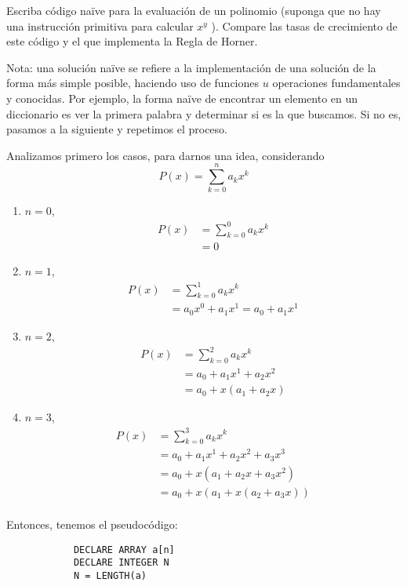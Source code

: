 \begin{problema}
    Escriba código naïve para la evaluación de un polinomio (suponga que no hay una instrucción primitiva para calcular $x^y$ ). Compare las tasas de crecimiento de este código y el que implementa la Regla de Horner.
    \begin{cajita}
        Nota: una solución naïve se refiere a la implementación de una solución de la forma más simple posible, haciendo uso de funciones $u$ operaciones fundamentales y conocidas. Por ejemplo, la forma naïve de encontrar un elemento en un diccionario es ver la primera palabra y determinar si es la que buscamos. Si no es, pasamos a la siguiente y repetimos el proceso.
    \end{cajita} 
    \begin{sol}
        Analizamos primero los casos, para darnos una idea, considerando 
        $$P(x)=\sum_{k=0}^n a_k x^k$$
        \begin{enumerate}
            \item $n=0$, 
            \begin{align*}
                P(x)&=\sum_{k=0}^0 a_k x^k\\
                    &= 0
            \end{align*}
            \item $n=1$, 
            \begin{align*}
                P(x)&=\sum_{k=0}^1 a_k x^k\\
                &= a_0x^0 +a_1x^1 = a_0+a_1x^1
            \end{align*}
            \item $n=2$, 
            \begin{align*}
                P(x)&=\sum_{k=0}^2 a_k x^k\\
                &= a_0+a_1x^1 +a_2x^2\\
                &= a_0 +x(a_1+a_2x)
            \end{align*}
            \item $n=3$, 
            \begin{align*}
                P(x)&=\sum_{k=0}^3 a_k x^k\\
                &= a_0+a_1x^1 +a_2x^2 +a_3x^3\\
                &= a_0 +x(a_1+a_2x+a_3x^2)\\
                &= a_0 +x(a_1+x(a_2+a_3x))\\
            \end{align*}
        \end{enumerate}
        Entonces, tenemos el pseudocódigo:
        \begin{verbatim}
            DECLARE ARRAY a[n]
            DECLARE INTEGER N
            N = LENGTH(a)
            

\end{verbatim}
\end{sol}
\end{problema}
